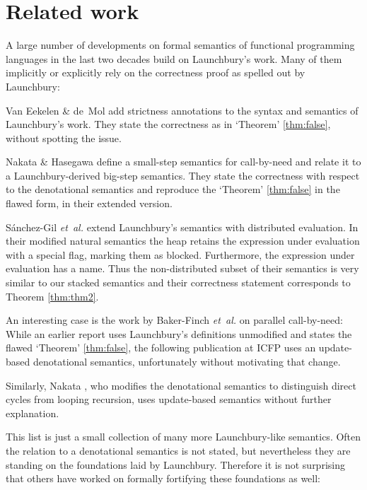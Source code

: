 \documentclass{jfp1}
\theoremstyle{nonumberbreak}
\begin{document}
\section{Related work}

A large number of developments on formal semantics of functional programming languages in the last two decades build on Launchbury’s work. Many of them implicitly or explicitly rely on the correctness proof as spelled out by Launchbury:

Van Eekelen \& de~Mol  add strictness annotations to the syntax and semantics of Launchbury’s work. They state the correctness as in `Theorem' \ref{thm:false}, without spotting the issue.


Nakata \& Hasegawa  define a small-step semantics for call-by-need and relate it to a Launchbury-derived big-step semantics. They state the correctness with respect to the denotational semantics and reproduce the `Theorem' \ref{thm:false} in the flawed form, in their extended version.

S{\'a}nchez-Gil {\em et~al.}  extend Launchbury's semantics with distributed evaluation.  In their modified natural semantics the heap retains the expression under evaluation with a special flag, marking them as blocked. Furthermore, the expression under evaluation has a name. Thus the non-distributed subset of their semantics is very similar to our stacked semantics and their correctness statement corresponds to Theorem \ref{thm:thm2}.

An interesting case is the work by Baker-Finch {\em et~al.} on parallel call-by-need: While an earlier report  uses Launchbury’s definitions unmodified and states the flawed `Theorem' \ref{thm:false}, the following publication at ICFP  uses an update-based denotational semantics, unfortunately without motivating that change.

Similarly, Nakata  , who modifies the denotational semantics to distinguish direct cycles from looping recursion, uses update-based semantics without further explanation. 

This list is just a small collection of many more Launchbury-like semantics. Often the relation to a denotational semantics is not stated, but nevertheless they are standing on the foundations laid by Launchbury. Therefore it is not surprising that others have worked on formally fortifying these foundations as well:
\end{document}
